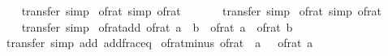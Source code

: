 \begin{isabellebody}
%
\isadelimproof
\ \ %
\endisadelimproof
%
\isatagproof
{}\isamarkupfalse%
\ transfer\ simp%
\endisatagproof
{\isafoldproof}%
%
\isadelimproof
\isanewline
%
\endisadelimproof
\isanewline
{}\isamarkupfalse%
\ of{\isacharunderscore}{\kern0pt}rat{\isacharunderscore}{\kern0pt}{}\ {\isacharbrackleft}{\kern0pt}simp{\isacharbrackright}{\kern0pt}{\isacharcolon}{\kern0pt}\ {\isachardoublequoteopen}of{\isacharunderscore}{\kern0pt}rat\ {}\ {\isacharequal}{\kern0pt}\ {}{\isachardoublequoteclose}\isanewline
%
\isadelimproof
\ \ %
\endisadelimproof
%
\isatagproof
{}\isamarkupfalse%
\ transfer\ simp%
\endisatagproof
{\isafoldproof}%
%
\isadelimproof
\isanewline
%
\endisadelimproof
\isanewline
{}\isamarkupfalse%
\ of{\isacharunderscore}{\kern0pt}rat{\isacharunderscore}{\kern0pt}{}\ {\isacharbrackleft}{\kern0pt}simp{\isacharbrackright}{\kern0pt}{\isacharcolon}{\kern0pt}\ {\isachardoublequoteopen}of{\isacharunderscore}{\kern0pt}rat\ {}\ {\isacharequal}{\kern0pt}\ {}{\isachardoublequoteclose}\isanewline
%
\isadelimproof
\ \ %
\endisadelimproof
%
\isatagproof
{}\isamarkupfalse%
\ transfer\ simp%
\endisatagproof
{\isafoldproof}%
%
\isadelimproof
\isanewline
%
\endisadelimproof
\isanewline
{}\isamarkupfalse%
\ of{\isacharunderscore}{\kern0pt}rat{\isacharunderscore}{\kern0pt}add{\isacharcolon}{\kern0pt}\ {\isachardoublequoteopen}of{\isacharunderscore}{\kern0pt}rat\ {\isacharparenleft}{\kern0pt}a\ {\isacharplus}{\kern0pt}\ b{\isacharparenright}{\kern0pt}\ {\isacharequal}{\kern0pt}\ of{\isacharunderscore}{\kern0pt}rat\ a\ {\isacharplus}{\kern0pt}\ of{\isacharunderscore}{\kern0pt}rat\ b{\isachardoublequoteclose}\isanewline
%
\isadelimproof
\ \ %
\endisadelimproof
%
\isatagproof
{}\isamarkupfalse%
\ transfer\ {\isacharparenleft}{\kern0pt}simp\ add{\isacharcolon}{\kern0pt}\ add{\isacharunderscore}{\kern0pt}frac{\isacharunderscore}{\kern0pt}eq{\isacharparenright}{\kern0pt}%
\endisatagproof
{\isafoldproof}%
%
\isadelimproof
\isanewline
%
\endisadelimproof
\isanewline
{}\isamarkupfalse%
\ of{\isacharunderscore}{\kern0pt}rat{\isacharunderscore}{\kern0pt}minus{\isacharcolon}{\kern0pt}\ {\isachardoublequoteopen}of{\isacharunderscore}{\kern0pt}rat\ {\isacharparenleft}{\kern0pt}{\isacharminus}{\kern0pt}\ a{\isacharparenright}{\kern0pt}\ {\isacharequal}{\kern0pt}\ {\isacharminus}{\kern0pt}\ of{\isacharunderscore}{\kern0pt}rat\ a{\isachardoublequoteclose}\isanewline
%
\isadelimproof
\ \ %
\endisadelimproof

\end{isabellebody}

